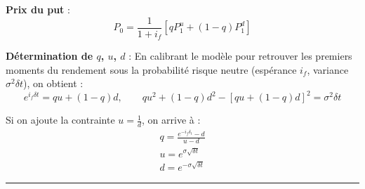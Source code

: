 \begin{f}
\textbf{Prix du put} :
\[
P_{0} = \frac{1}{1+i_f} \left[ q P_{1}^{u} + (1 - q) P_{1}^{d} \right]
\]

\textbf{Détermination de \(q\), \(u\), \(d\)} :  
En calibrant le modèle pour retrouver les premiers moments du rendement sous la probabilité risque neutre (espérance \(i_f\), variance \(\sigma^2 \delta t\)), on obtient :
\[
e^{i_{f} \delta t} = q u + (1-q) d, \qquad q u^2 + (1-q) d^2 - [q u + (1-q) d]^2 = \sigma^2 \delta t
\]

Si on ajoute la contrainte \(u = \frac{1}{d}\), on arrive à :
\[
\begin{array}{l}
	q = \frac{e^{-i_f \delta_t} - d}{u - d} \\
	u = e^{\sigma \sqrt{\delta t}} \\
	d = e^{-\sigma \sqrt{\delta t}}
\end{array}
\]

\end{f}
\hrule

